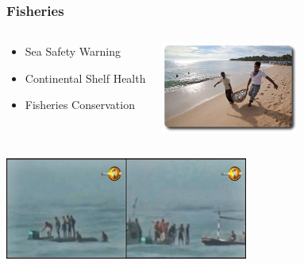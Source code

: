 \documentclass[serif,mathserif]{beamer}
\begin{document}
\begin{frame}
  \frametitle{Fisheries}
\begin{columns}
\begin{center}
\begin{itemize}
 \item Sea Safety Warning
 \item Continental Shelf Health
 \item Fisheries Conservation
\end{itemize}
\end{center}

\begin{center}
 \includegraphics[width=4.5cm]{fishing_basket_beach}
\end{center}
\end{columns}
\vspace{2mm}
\begin{flushleft}
 \includegraphics[width=8cm]{boat-capzise}
\end{flushleft}
\end{frame}
\end{document}
